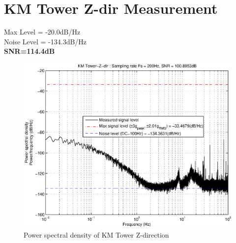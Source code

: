 \documentclass[11pt]{article} %
\begin{document}
\section{KM Tower Z-dir Measurement}
Max Level = -20.0dB/Hz\\
Noise Level = -134.3dB/Hz\\
\textbf{SNR=114.4dB}
\begin{figure}[!hbpt]
\centering
\includegraphics[keepaspectratio=true,width=1\linewidth]{figs/KMTower-Z-dir.eps}
\caption{Power spectral density of KM Tower Z-direction}
\label{fig:psd3}
\end{figure}

\end{document}
